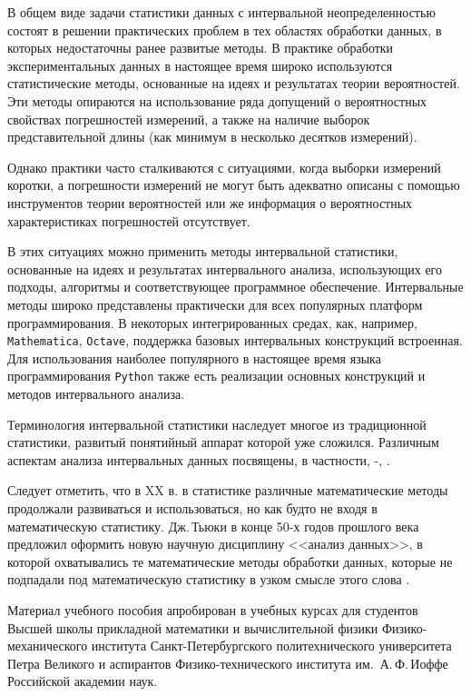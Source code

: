 \documentclass[a5paper,openany]{book}
\begin{document}
{{В общем виде задачи статистики данных с интервальной неопределенностью состоят в решении практических проблем в тех областях обработки данных, в которых недостаточны ранее развитые методы.
В практике обработки экспериментальных данных в настоящее время широко используются 
статистические методы, основанные на идеях и результатах теории вероятностей. Эти методы 
опираются на использование ряда допущений о вероятностных свойствах погрешностей 
измерений, а также на наличие выборок представительной длины (как минимум в несколько 
десятков измерений). 

Однако практики часто сталкиваются с ситуациями, когда выборки 
измерений коротки, а погрешности 
измерений не могут быть адекватно описаны с помощью инструментов теории вероятностей 
или же информация о вероятностных характеристиках погрешностей отсутствует. 

В этих ситуациях можно применить методы интервальной статистики, основанные на идеях и результатах интервального анализа, использующих его подходы, алгоритмы и соответствующее программное обеспечение. 
Интервальные методы широко представлены практически для всех популярных платформ программирования. В некоторых интегрированных средах, как, например, {\tt Mathematica}, {\tt Octave}, поддержка базовых интервальных конструкций встроенная.   
Для использования наиболее популярного в настоящее время языка программирования {\tt Python} также есть реализации основных конструкций и методов интервального анализа. 

Терминология интервальной 
статистики наследует 
многое из традиционной статистики,  развитый понятийный аппарат которой уже сложился. 
Различным аспектам анализа интервальных данных посвящены, в частности,   \cite{SSharyJCT2017}-\cite{Kumkov2013}, \cite{NguyenKreinWuXiang}.

Следует отметить, что в XX в. в статистике различные математические методы  продолжали развиваться и использоваться, но как будто не входя в математическую статистику. Дж.\,Тьюки в конце 50-х годов прошлого века предложил оформить 
новую научную дисциплину <<анализ данных>>, в которой 
охватывались те математические методы обработки данных, которые не подпадали 
под математическую статистику в узком смысле этого слова \cite{Tukey1962}.


Материал учебного пособия апробирован в учебных курсах для студентов  
Высшей школы прикладной математики и вычислительной физики
 Физико-механического института Санкт-Петербургского политехнического университета Петра Великого
 и аспирантов Физико-технического института им.~А.\,Ф.\,Иоффе Российской академии наук.
 

}}
\end{document}
